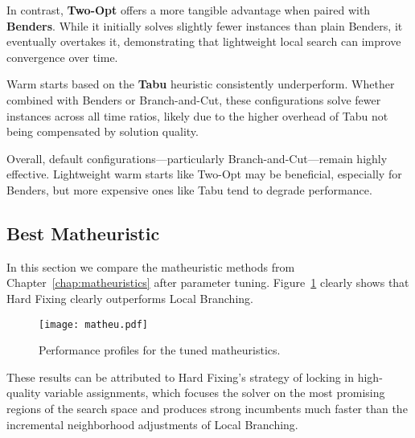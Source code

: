 In contrast, \textbf{Two-Opt} offers a more tangible advantage when paired with \textbf{Benders}. While it initially solves slightly fewer instances than plain Benders, it eventually overtakes it, demonstrating that lightweight local search can improve convergence over time.

Warm starts based on the \textbf{Tabu} heuristic consistently underperform. Whether combined with Benders or Branch-and-Cut, these configurations solve fewer instances across all time ratios, likely due to the higher overhead of Tabu not being compensated by solution quality.

Overall, default configurations—particularly Branch-and-Cut—remain highly effective. Lightweight warm starts like Two-Opt may be beneficial, especially for Benders, but more expensive ones like Tabu tend to degrade performance.

\subsection{Best Matheuristic}
\label{ssec:best-matheu}

In this section we compare the matheuristic methods from Chapter~\ref{chap:matheuristics} after parameter tuning. Figure~\ref{fig:matheu} clearly shows that Hard Fixing clearly outperforms Local Branching.

\begin{figure}[H]
  \centering
  \texttt{[image: matheu.pdf]}
  \caption{Performance profiles for the tuned matheuristics.}
  \label{fig:matheu}
\end{figure}

These results can be attributed to Hard Fixing's strategy of locking in high-quality variable assignments, which focuses the solver on the most promising regions of the search space and produces strong incumbents much faster than the incremental neighborhood adjustments of Local Branching.  
